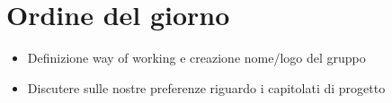 \section{Ordine del giorno}

\begin{itemize}
    \item Definizione way of working e creazione nome/logo del gruppo
    \item Discutere sulle nostre preferenze riguardo i capitolati di progetto
\end{itemize}